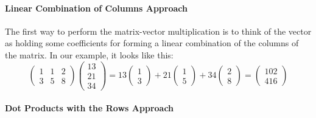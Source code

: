 \documentclass[10pt,]{book}
\theoremstyle{plain}
\numberwithin{equation}{section}
\begin{document}
\paragraph[Linear Combination of Columns Approach]{Linear Combination of Columns Approach}\label{paragraph-6}

          The first way to perform the matrix-vector multiplication is to think
          of the vector as holding some coefficients for forming a linear
          combination of the columns of the matrix. In our example, it looks
          like this:\[
            \begin{pmatrix} 1 & 1 & 2 \\ 3 & 5 & 8 \end{pmatrix}
            \begin{pmatrix} 13 \\ 21 \\ 34 \end{pmatrix} =
            13 \begin{pmatrix} 1 \\ 3 \end{pmatrix} + 21 \begin{pmatrix} 1 \\ 5
            \end{pmatrix} + 34 \begin{pmatrix} 2 \\ 8 \end{pmatrix} =
            \begin{pmatrix} 102 \\ 416 \end{pmatrix}
          \]
\typeout{************************************************}
\typeout{************************************************}
\paragraph[Dot Products with the Rows Approach]{Dot Products with the Rows Approach}\label{paragraph-7}
\end{document}
